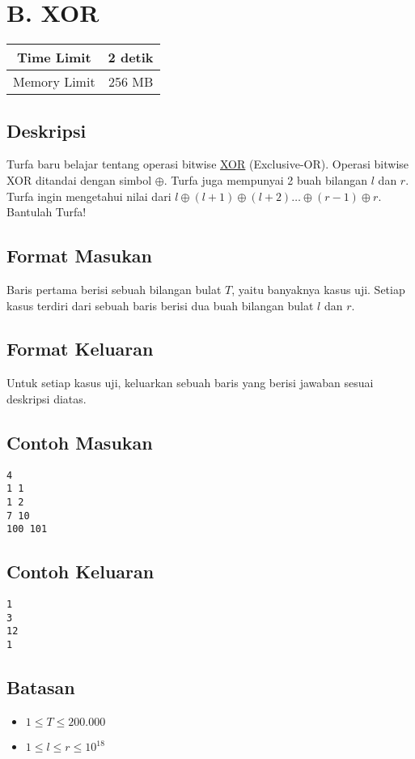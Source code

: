\documentclass{article}
\begin{document}
\section*{\hfil B. XOR\hfil}

\begin{center}
\begin{tabular}{ |cc| } 
 \hline
 Time Limit & 2 detik \\ 
 \hline
 Memory Limit & 256 MB \\
 \hline
\end{tabular}
\end{center}

\subsection*{Deskripsi}
\par Turfa baru belajar tentang operasi bitwise \href{https://en.wikipedia.org/wiki/Exclusive_or}{XOR} (Exclusive-OR). Operasi bitwise XOR ditandai dengan simbol $\oplus$. Turfa juga mempunyai 2 buah bilangan $l$ dan $r$. Turfa ingin mengetahui nilai dari $l \oplus (l + 1) \oplus (l + 2) \dots \oplus (r - 1) \oplus r$. Bantulah Turfa!

\subsection*{Format Masukan}
\par Baris pertama berisi sebuah bilangan bulat $T$, yaitu banyaknya kasus uji.
\newline Setiap kasus terdiri dari sebuah baris berisi dua buah bilangan bulat $l$ dan $r$.

\subsection*{Format Keluaran}

\par Untuk setiap kasus uji, keluarkan sebuah baris yang berisi jawaban sesuai deskripsi diatas. 

\subsection*{Contoh Masukan}

\begin{lstlisting}
4
1 1
1 2
7 10
100 101

\end{lstlisting}

\subsection*{Contoh Keluaran}

\begin{lstlisting}
1
3
12
1

\end{lstlisting}

\subsection*{Batasan}

\begin{itemize}
	\item $1 \leq T\leq 200.000$
	\item $1 \leq l \leq r \leq 10^{18}$
\end{itemize}
\end{document}
